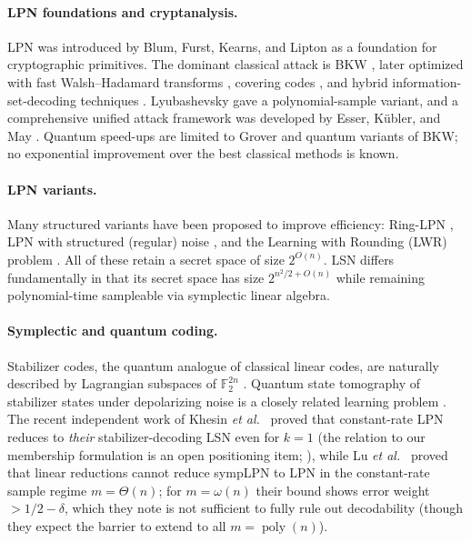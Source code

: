 \documentclass[11pt,a4paper]{article}
\theoremstyle{plain}
\theoremstyle{definition}
\newcommand{\F}{\mathbb{F}}
\newcommand{\etal}{\textit{et al.}}
\begin{document}
\paragraph{LPN foundations and cryptanalysis.}
LPN was introduced by Blum, Furst, Kearns, and Lipton \cite{BFKL94} as a foundation for cryptographic primitives. The dominant classical attack is BKW \cite{BKW03}, later optimized with fast Walsh--Hadamard transforms \cite{LF06}, covering codes \cite{GJL14}, and hybrid information-set-decoding techniques \cite{EKM17}. Lyubashevsky \cite{Lyu05} gave a polynomial-sample variant, and a comprehensive unified attack framework was developed by Esser, K{\"u}bler, and May \cite{EKM17}. Quantum speed-ups are limited to Grover \cite{Gro96} and quantum variants of BKW; no exponential improvement over the best classical methods is known.

\paragraph{LPN variants.}
Many structured variants have been proposed to improve efficiency: Ring-LPN \cite{HKL+12}, LPN with structured (regular) noise \cite{BCGI18}, and the Learning with Rounding (LWR) problem \cite{BPR12}. All of these retain a secret space of size $2^{O(n)}$. LSN differs fundamentally in that its secret space has size $2^{n^2/2 + O(n)}$ while remaining polynomial-time sampleable via symplectic linear algebra.

\paragraph{Symplectic and quantum coding.}
Stabilizer codes, the quantum analogue of classical linear codes, are naturally described by Lagrangian subspaces of $\F_2^{2n}$ \cite{Got97,CRSS98,NC00}. Quantum state tomography of stabilizer states under depolarizing noise is a closely related learning problem \cite{GL22}. The recent independent work of Khesin \etal\ \cite{KLP+25} proved that constant-rate LPN reduces to \emph{their} stabilizer-decoding LSN even for $k=1$ (the relation to our membership formulation is an open positioning item; ), while Lu \etal\ \cite{LPQR26} proved that linear reductions cannot reduce sympLPN to LPN in the constant-rate sample regime $m=\Theta(n)$; for $m=\omega(n)$ their bound shows error weight $>1/2-\delta$, which they note is not sufficient to fully rule out decodability (though they expect the barrier to extend to all $m=\operatorname{poly}(n)$).
\end{document}
